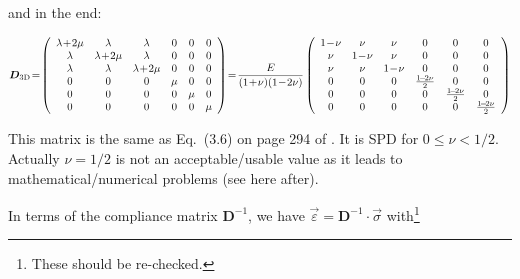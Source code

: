 and in the end:
\begin{mdframed}[backgroundcolor=blue!5]
\begin{small}
\begin{equation}
{\bm D}_{\rm 3D} \!= \!
\left(
\begin{array}{cccccc}
\lambda\!+\!2\mu & \lambda & \lambda & 0 & 0 & 0 \\ 
\lambda & \lambda\!+\!2\mu & \lambda & 0 & 0 & 0 \\ 
\lambda & \lambda & \lambda\!+\!2\mu & 0 & 0 & 0 \\
0 & 0 & 0 & \mu & 0 & 0 \\ 
0 & 0 & 0 & 0 & \mu & 0 \\ 
0 & 0 & 0 & 0 & 0 & \mu  
\end{array}
\right)
\!=\!
\frac{E}{(1\!+\!\nu)(1\!-\!2\nu)}
\left(
\begin{array}{cccccc}
1\!-\!\nu & \nu & \nu & 0 & 0 & 0 \\ 
\nu & 1\!-\!\nu & \nu& 0 & 0 & 0 \\ 
\nu & \nu & 1\!-\!\nu & 0 & 0 & 0 \\
0 & 0 & 0 & \frac{1\!-\!2\nu}{2} & 0 & 0 \\ 
0 & 0 & 0 & 0 & \frac{1\!-\!2\nu}{2} & 0 \\ 
0 & 0 & 0 & 0 & 0 & \frac{1\!-\!2\nu}{2}
\end{array}
\right)
\label{eq:D_3D}
\end{equation}
\end{small}
\end{mdframed}
This matrix is the same as Eq.~(3.6) on page 294 of \textcite{braess}.
It is SPD for $0\leq \nu < 1/2$. Actually $\nu=1/2$ is 
not an acceptable/usable value as it leads to 
mathematical/numerical problems (see here after).

In terms of the compliance matrix ${\bm D}^{-1}$, we have $\vec{\varepsilon} 
= {\bm D}^{-1} \cdot \vec{\sigma}$ with\footnote{These should be re-checked.}


